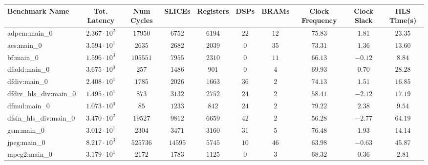 \begin{tabular}{|l|c|c|c|c|c|c|c|c|c|}
\hline
Benchmark Name          & Tot. Latency           & Num Cycles & SLICEs    & Registers & DSPs    & BRAMs   & Clock Frequency & Clock Slack & HLS Time(s) \\
\hline
adpcm:main\_0           & $ 2.367 \cdot 10^{2} $ & $ 17950  $ & $ 6752  $ & $ 6194  $ & $ 22  $ & $ 12  $ & $ 75.83       $ & $ 1.81    $ & $ 23.35   $ \\
aes:main\_0             & $ 3.594 \cdot 10^{1} $ & $ 2635   $ & $ 2682  $ & $ 2039  $ & $ 0   $ & $ 35  $ & $ 73.31       $ & $ 1.36    $ & $ 13.60   $ \\
bf:main\_0              & $ 1.596 \cdot 10^{3} $ & $ 105551 $ & $ 7955  $ & $ 2310  $ & $ 0   $ & $ 11  $ & $ 66.13       $ & $ -0.12   $ & $ 8.84    $ \\
dfadd:main\_0           & $ 3.675 \cdot 10^{0} $ & $ 257    $ & $ 1486  $ & $ 901   $ & $ 0   $ & $ 4   $ & $ 69.93       $ & $ 0.70    $ & $ 28.28   $ \\
dfdiv:main\_0           & $ 2.408 \cdot 10^{1} $ & $ 1785   $ & $ 2026  $ & $ 1663  $ & $ 36  $ & $ 2   $ & $ 74.13       $ & $ 1.51    $ & $ 16.85   $ \\
dfdiv\_hls\_div:main\_0 & $ 1.495 \cdot 10^{1} $ & $ 873    $ & $ 3132  $ & $ 2752  $ & $ 24  $ & $ 2   $ & $ 58.41       $ & $ -2.12   $ & $ 17.19   $ \\
dfmul:main\_0           & $ 1.073 \cdot 10^{0} $ & $ 85     $ & $ 1233  $ & $ 842   $ & $ 24  $ & $ 2   $ & $ 79.22       $ & $ 2.38    $ & $ 9.54    $ \\
dfsin\_hls\_div:main\_0 & $ 3.470 \cdot 10^{2} $ & $ 19527  $ & $ 9812  $ & $ 6659  $ & $ 42  $ & $ 2   $ & $ 56.28       $ & $ -2.77   $ & $ 64.19   $ \\
gsm:main\_0             & $ 3.012 \cdot 10^{1} $ & $ 2304   $ & $ 3471  $ & $ 3160  $ & $ 31  $ & $ 5   $ & $ 76.48       $ & $ 1.93    $ & $ 14.14   $ \\
jpeg:main\_0            & $ 8.217 \cdot 10^{3} $ & $ 525736 $ & $ 14595 $ & $ 5745  $ & $ 10  $ & $ 46  $ & $ 63.98       $ & $ -0.63   $ & $ 45.87   $ \\
mpeg2:main\_0           & $ 3.179 \cdot 10^{1} $ & $ 2172   $ & $ 1783  $ & $ 1125  $ & $ 0   $ & $ 3   $ & $ 68.32       $ & $ 0.36    $ & $ 2.81    $ \\

\end{tabular}
